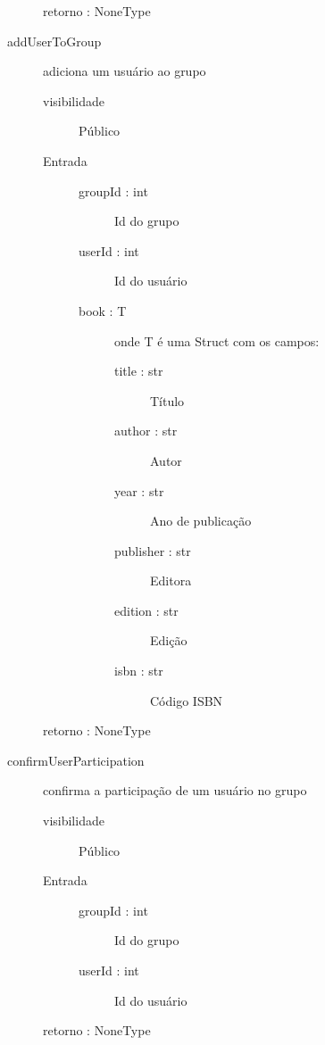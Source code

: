 \documentclass[a4paper]{article}
\begin{document}
\begin{description}
\begin{description}
			 \item [retorno : NoneType ]
				
			\end{description} %
			
			\item [addUserToGroup] adiciona um usuário ao grupo
			\begin{description} %
			 \item [visibilidade] Público
			 \item [Entrada] \mbox{}
				\begin{description} %
				 \item [groupId : int] Id do grupo
				 \item [userId : int] Id do usuário
				 \item [book : T] onde T é uma Struct com os campos:
					\begin{description} 
					\item [title : str] Título
					\item [author : str] Autor
					\item [year : str] Ano de publicação
					\item [publisher : str] Editora
					\item [edition : str] Edição
					\item [isbn : str] Código ISBN
					\end{description} 
				\end{description} %
				
			 \item [retorno : NoneType ]
				
			\end{description} %
			
			\item [confirmUserParticipation] confirma a participação de um usuário no grupo
			\begin{description} %
			 \item [visibilidade] Público
			 \item [Entrada] \mbox{}
				\begin{description} %
				 \item [groupId : int] Id do grupo
				 \item [userId : int] Id do usuário
				\end{description} %
				
			 \item [retorno : NoneType ]
			 

\end{description}
\end{description}
\end{document}
